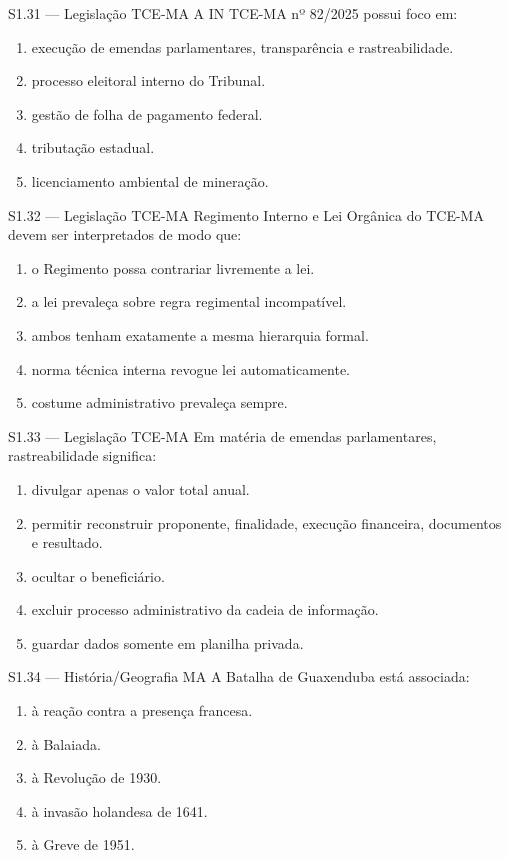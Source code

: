 \begin{questao}{S1.31 — Legislação TCE-MA}
A IN TCE-MA nº 82/2025 possui foco em:
\begin{enumerate}[label=\Alph*)]
\item execução de emendas parlamentares, transparência e rastreabilidade.
\item processo eleitoral interno do Tribunal.
\item gestão de folha de pagamento federal.
\item tributação estadual.
\item licenciamento ambiental de mineração.
\end{enumerate}
\end{questao}

\begin{questao}{S1.32 — Legislação TCE-MA}
Regimento Interno e Lei Orgânica do TCE-MA devem ser interpretados de modo que:
\begin{enumerate}[label=\Alph*)]
\item o Regimento possa contrariar livremente a lei.
\item a lei prevaleça sobre regra regimental incompatível.
\item ambos tenham exatamente a mesma hierarquia formal.
\item norma técnica interna revogue lei automaticamente.
\item costume administrativo prevaleça sempre.
\end{enumerate}
\end{questao}

\begin{questao}{S1.33 — Legislação TCE-MA}
Em matéria de emendas parlamentares, rastreabilidade significa:
\begin{enumerate}[label=\Alph*)]
\item divulgar apenas o valor total anual.
\item permitir reconstruir proponente, finalidade, execução financeira, documentos e resultado.
\item ocultar o beneficiário.
\item excluir processo administrativo da cadeia de informação.
\item guardar dados somente em planilha privada.
\end{enumerate}
\end{questao}

\begin{questao}{S1.34 — História/Geografia MA}
A Batalha de Guaxenduba está associada:
\begin{enumerate}[label=\Alph*)]
\item à reação contra a presença francesa.
\item à Balaiada.
\item à Revolução de 1930.
\item à invasão holandesa de 1641.
\item à Greve de 1951.
\end{enumerate}
\end{questao}

